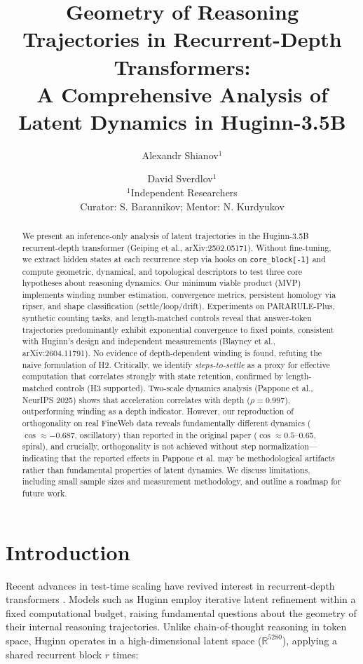 \documentclass[12pt,a4paper]{article}
\title{Geometry of Reasoning Trajectories in Recurrent-Depth Transformers:\\A Comprehensive Analysis of Latent Dynamics in Huginn-3.5B}
\author{Alexandr Shianov$^{1}$ \and David Sverdlov$^{1}$ \\
\small{$^{1}$Independent Researchers} \\
\small{Curator: S. Barannikov; Mentor: N. Kurdyukov}}
\date{}
\begin{document}
\maketitle

\begin{abstract}
We present an inference-only analysis of latent trajectories in the Huginn-3.5B recurrent-depth transformer (Geiping et al., arXiv:2502.05171). Without fine-tuning, we extract hidden states at each recurrence step via hooks on \texttt{core\_block[-1]} and compute geometric, dynamical, and topological descriptors to test three core hypotheses about reasoning dynamics. Our minimum viable product (MVP) implements winding number estimation, convergence metrics, persistent homology via ripser, and shape classification (settle/loop/drift). Experiments on PARARULE-Plus, synthetic counting tasks, and length-matched controls reveal that answer-token trajectories predominantly exhibit exponential convergence to fixed points, consistent with Huginn's design and independent measurements (Blayney et al., arXiv:2604.11791). No evidence of depth-dependent winding is found, refuting the naive formulation of H2. Critically, we identify \textit{steps-to-settle} as a proxy for effective computation that correlates strongly with state retention, confirmed by length-matched controls (H3 supported). Two-scale dynamics analysis (Pappone et al., NeurIPS 2025) shows that acceleration correlates with depth ($\rho = 0.997$), outperforming winding as a depth indicator. However, our reproduction of orthogonality on real FineWeb data reveals fundamentally different dynamics ($\cos \approx -0.687$, oscillatory) than reported in the original paper ($\cos \approx 0.5$--0.65, spiral), and crucially, orthogonality is not achieved without step normalization—indicating that the reported effects in Pappone et al. may be methodological artifacts rather than fundamental properties of latent dynamics. We discuss limitations, including small sample sizes and measurement methodology, and outline a roadmap for future work.
\end{abstract}

\section{Introduction}

Recent advances in test-time scaling have revived interest in recurrent-depth transformers \cite{geiping2025scaling}. Models such as Huginn employ iterative latent refinement within a fixed computational budget, raising fundamental questions about the geometry of their internal reasoning trajectories. Unlike chain-of-thought reasoning in token space, Huginn operates in a high-dimensional latent space ($\mathbb{R}^{5280}$), applying a shared recurrent block $r$ times:
\end{document}
